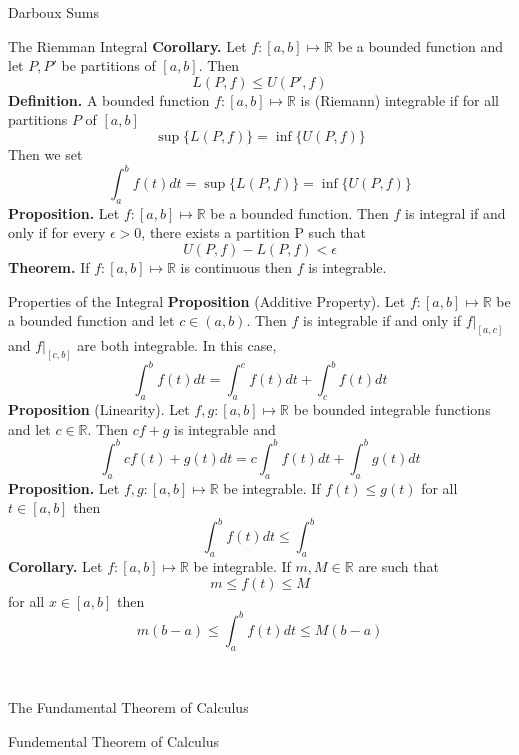\documentclass{article}
\newcommand{\real}{\mathbb{R}}
\begin{document}
\begin{multicols*}{3}
\begin{blackbox}{Darboux Sums}
\end{blackbox}
\begin{blackbox}{The Riemman Integral}
    \textbf{Corollary.} Let $f: [a,b] \mapsto \real$ be a bounded function and let $P, P'$ be partitions of $[a,b]$. Then 
    \[L(P,f) \leq U(P',f)\]
    \textbf{Definition.} A bounded function $f: [a,b] \mapsto \real$ is (Riemann) integrable if for all partitions $P$ of $[a,b]$
    \[\sup\{L(P,f)\} = \inf \{U(P,f)\}\]
    Then we set 
    \[\int_a^b f(t) dt = \sup\{L(P,f)\} = \inf \{U(P,f)\}\]
    \textbf{Proposition.} Let $f: [a,b] \mapsto \real$ be a bounded function. Then $f$ is integral if and only if for every $\epsilon > 0$, there exists a partition P such that 
    \[U(P,f) - L(P,f) < \epsilon\]
    \textbf{Theorem.} If $f: [a,b] \mapsto \real$ is continuous then $f$ is integrable. 
    \begin{redbox}{Properties of the Integral}
        \textbf{Proposition} (Additive Property). Let $f: [a,b]\mapsto \real$ be a bounded function and let $c \in (a,b)$. Then $f$ is integrable if and only if $f|_{[a,c]}$ and $f|_{[c,b]}$ are both integrable. In this case,
        \[\int_a^b f(t)dt = \int_a^c f(t) dt + \int_c^b f(t) dt\]
        \textbf{Proposition} (Linearity). Let $f,g : [a,b]\mapsto \real$ be bounded integrable functions and let $c \in \real$. Then $cf + g$ is integrable and 
        \[\int_a^b cf(t) + g(t) dt = c\int_a^b f(t) dt  + \int_a^b g(t) dt\]
        \textbf{Proposition.} Let $f,g : [a,b] \mapsto \real$ be integrable. If $f(t) \leq g(t)$ for all $t \in [a,b]$ then 
        \[\int_a^b f(t) dt \leq \int_a^b\]
        \textbf{Corollary.} Let $f: [a,b]\mapsto \real$ be integrable. If $m, M \in \real$ are such that 
        \[m \leq f(t) \leq M\]
        for all $x \in [a,b]$ then 
        \[m(b-a) \leq \int_a^b f(t) dt \leq M(b-a)\]
    \end{redbox}\\[-2ex]
\end{blackbox}
\begin{blackbox}{The Fundamental Theorem of Calculus}
    \begin{bluebox}{Fundemental Theorem of Calculus}
        

\end{bluebox}
\end{blackbox}
\end{multicols*}
\end{document}
